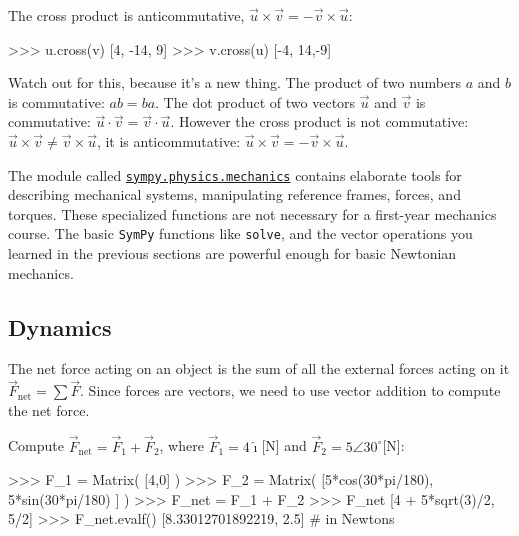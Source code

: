 \noindent
The cross product is anticommutative, $\vec{u}\times\vec{v} = -\vec{v}\times\vec{u}$:
\small
\begin{verbatimtab}
>>> u.cross(v)
[4, -14, 9]
>>> v.cross(u)
[-4, 14,-9]
\end{verbatimtab}
\normalsize

\noindent

Watch out for this, because it's a new thing.
The product of two numbers $a$ and $b$ is commutative: $ab = ba$.			
The dot product of two vectors $\vec{u}$ and $\vec{v}$ is commutative: $\vec{u}\cdot\vec{v} = \vec{v}\cdot\vec{u}$.
However the cross product is not commutative: $\vec{u}\times\vec{v} \neq \vec{v}\times\vec{u}$,
it is anticommutative: $\vec{u}\times\vec{v} = -\vec{v}\times\vec{u}$.




\label{sec:sympytut_mechanics}

The module called \href{http://pyvideo.org/video/2653/dynamics-and-control-with-python}{\texttt{sympy.physics.mechanics}} 
contains elaborate tools for describing mechanical systems,
manipulating reference frames, forces, and torques.
These specialized functions are not necessary for a first-year mechanics course.
The basic \texttt{SymPy} functions like \texttt{solve},
and the vector operations you learned in the previous sections are powerful enough for basic Newtonian mechanics.

\subsection{Dynamics}
\label{mechanics:dynamics}

The net force acting on an object is the sum of all the external forces acting on it $\vec{F}_{\textrm{net}} = \sum \vec{F}$.
Since forces are vectors,																		
we need to use vector addition to compute the net force.

Compute $\vec{F}_{\textrm{net}}=\vec{F}_1 + \vec{F}_2$,
where $\vec{F}_1=4\hat{\imath}$[N] and $\vec{F}_2 = 5\angle 30^\circ$[N]:
\small
\begin{verbatimtab}
>>> F_1 = Matrix( [4,0] ) 
>>> F_2 = Matrix( [5*cos(30*pi/180), 5*sin(30*pi/180) ] )
>>> F_net = F_1 + F_2
>>> F_net 
[4 + 5*sqrt(3)/2,   5/2]
>>> F_net.evalf()
[8.33012701892219,  2.5]          # in Newtons 
\end{verbatimtab}
\normalsize

